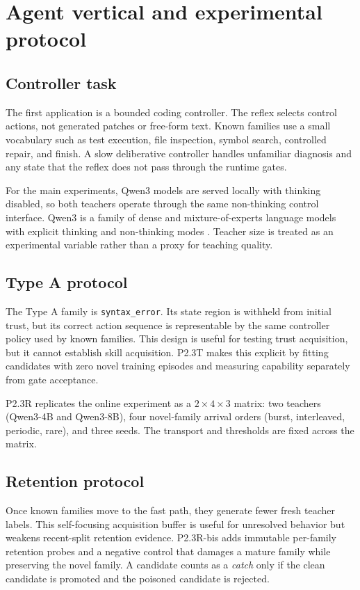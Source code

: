 \documentclass[10pt]{article}
\begin{document}
\section{Agent vertical and experimental protocol}

\subsection{Controller task}

The first application is a bounded coding controller. The reflex selects control actions, not generated patches or free-form text. Known families use a small vocabulary such as test execution, file inspection, symbol search, controlled repair, and finish. A slow deliberative controller handles unfamiliar diagnosis and any state that the reflex does not pass through the runtime gates.

For the main experiments, Qwen3 models are served locally with thinking disabled, so both teachers operate through the same non-thinking control interface. Qwen3 is a family of dense and mixture-of-experts language models with explicit thinking and non-thinking modes \cite{qwen3report}. Teacher size is treated as an experimental variable rather than a proxy for teaching quality.

\subsection{Type A protocol}

The Type A family is \texttt{syntax\_error}. Its state region is withheld from initial trust, but its correct action sequence is representable by the same controller policy used by known families. This design is useful for testing trust acquisition, but it cannot establish skill acquisition. P2.3T makes this explicit by fitting candidates with zero novel training episodes and measuring capability separately from gate acceptance.

P2.3R replicates the online experiment as a $2\times4\times3$ matrix: two teachers (Qwen3-4B and Qwen3-8B), four novel-family arrival orders (burst, interleaved, periodic, rare), and three seeds. The transport and thresholds are fixed across the matrix.

\subsection{Retention protocol}

Once known families move to the fast path, they generate fewer fresh teacher labels. This self-focusing acquisition buffer is useful for unresolved behavior but weakens recent-split retention evidence. P2.3R-bis adds immutable per-family retention probes and a negative control that damages a mature family while preserving the novel family. A candidate counts as a \emph{catch} only if the clean candidate is promoted and the poisoned candidate is rejected.
\end{document}
